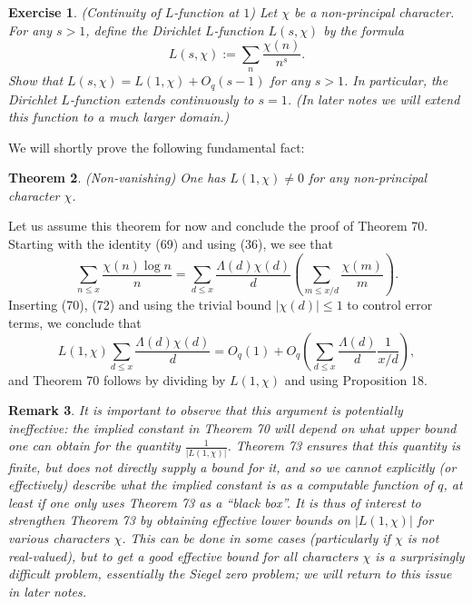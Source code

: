 \documentclass[10pt,reqno]{amsart}
\newtheorem{theorem}{Theorem}
\newtheorem{exercise}[theorem]{Exercise}
\newtheorem{remark}[theorem]{Remark}
\begin{document}
\begin{exercise}
    (Continuity of $L$-function at $1$) Let $\chi$ be a non-principal character. For any $s>1$, define the \emph{Dirichlet $L$-function} $L(s,\chi)$ by the formula
    \[  L(s,\chi) := \sum_n \frac{\chi(n)}{n^s}.\]
    Show that $L(s,\chi) = L(1,\chi) + O_q(s-1)$ for any $s>1$. In particular, the Dirichlet $L$-function extends continuously to $s=1$. (In later notes we will extend this function to a much larger domain.)
\end{exercise}

We will shortly prove the following fundamental fact:

\begin{theorem} (Non-vanishing) One has $L(1,\chi) \neq 0$ for any non-principal character $\chi$.
\end{theorem}

Let us assume this theorem for now and conclude the proof of Theorem 70. Starting with the identity (69) and using (36), we see that
%
\[  \sum_{n \leq x} \frac{\chi(n) \log n}{n} = \sum_{d \leq x} \frac{\Lambda(d) \chi(d)}{d} \left(\sum_{m \leq x/d} \frac{\chi(m)}{m} \right). \]
%
Inserting (70), (72) and using the trivial bound $|\chi(d)| \leq 1$ to control error terms, we conclude that
%
\[  L(1,\chi) \sum_{d \leq x} \frac{\Lambda(d) \chi(d)}{d} = O_q(1) + O_q \left( \sum_{d \leq x} \frac{\Lambda(d)}{d} \frac{1}{x/d} \right),\]
%
and Theorem 70 follows by dividing by $L(1,\chi)$ and using Proposition 18.

\begin{remark}
    It is important to observe that this argument is potentially \emph{ineffective}: the implied constant in Theorem 70 will depend on what upper bound one can obtain for the quantity $\frac{1}{|L(1,\chi)|}$. Theorem 73 ensures that this quantity is finite, but does not directly supply a bound for it, and so we cannot explicitly (or \emph{effectively}) describe what the implied constant is as a computable function of $q$, at least if one only uses Theorem 73 as a “black box”. It is thus of interest to strengthen Theorem 73 by obtaining effective lower bounds on $|L(1,\chi)|$ for various characters $\chi$. This can be done in some cases (particularly if $\chi$ is not real-valued), but to get a good effective bound for all characters $\chi$ is a surprisingly difficult problem, essentially the \emph{Siegel zero problem}; we will return to this issue in later notes.
\end{remark}
\end{document}
